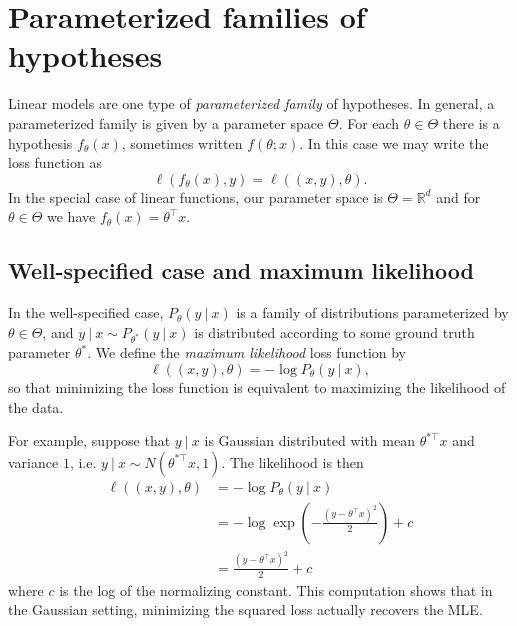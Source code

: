 \documentclass[]{subook}
\begin{document}
\section{Parameterized families of hypotheses}
Linear models are one type of \textit{parameterized family} of hypotheses. In general, a parameterized family is given by a parameter space $\Theta$. For each $\theta\in\Theta$ there is a hypothesis $f_\theta(x)$, sometimes written $f(\theta; x)$. In this case we may write the loss function as $$\ell(f_\theta(x),y) = \ell((x,y),\theta).$$ In the special case of linear functions, our parameter space is $\Theta = \mathbb{R}^d$ and for $\theta \in \Theta$ we have $f_\theta(x) = \theta^\top x.$

\subsection{Well-specified case and maximum likelihood}
In the well-specified case, $P_\theta(y\: | \: x)$ is a family of distributions parameterized by $\theta\in\Theta$, and $y\: | \: x \sim P_{\theta^*}(y\: | \: x)$ is distributed according to some ground truth parameter $\theta^*$. We define the \textit{maximum likelihood} loss function by $$\ell((x,y),\theta) = -\log P_\theta(y\: | \: x),$$ so that minimizing the loss function is equivalent to maximizing the likelihood of the data.

For example, suppose that $y\: | \: x$ is Gaussian distributed with mean $\theta^{*\top}x$ and variance $1$, i.e. $y\: | \: x \sim N(\theta^{*\top}x, 1)$. The likelihood is then
\begin{align*}
    \ell((x,y),\theta) &= -\log P_\theta(y\: | \:x) \\
    &= -\log \exp\left(-\frac{(y-\theta^\top x)^2}{2}\right) + c \\
    &= \frac{(y-\theta^\top x)^2}{2} + c
\end{align*}
where $c$ is the log of the normalizing constant. This computation shows that in the Gaussian setting, minimizing the squared loss actually recovers the MLE.
\end{document}
